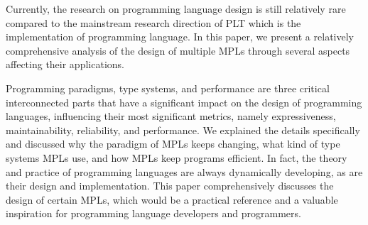 Currently, the research on programming language design is still relatively rare compared to the mainstream research direction of PLT which is the implementation of programming language. In this paper, we present a relatively comprehensive analysis of the design of multiple MPLs through several aspects affecting their applications.

%

Programming paradigms, type systems, and performance
are three critical interconnected parts that have a significant
impact on the design of programming languages, influencing
their most significant metrics, namely expressiveness, maintainability, reliability, and performance.
We explained the details specifically and discussed why the paradigm of
MPLs keeps changing, what kind of type systems MPLs use, and how MPLs keep programs efficient.
In fact, the theory and practice of programming languages are always dynamically
developing, as are their design and implementation.
This paper comprehensively discusses the design of certain MPLs, which
would be a practical reference and a valuable inspiration for
programming language developers and programmers.